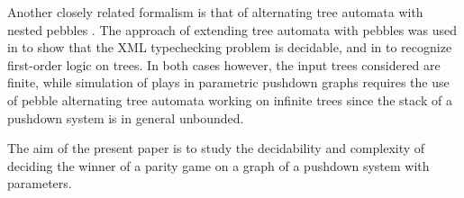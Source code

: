 \documentclass[a4paper,UKenglish,cleveref, autoref, thm-restate]{lipics-v2021}
\begin{document}
%
%




Another closely related formalism is that of alternating tree automata with nested pebbles%
. The approach of extending tree automata with pebbles was used in \cite{milo2000typechecking} to show that the XML typechecking problem is decidable, and in \cite{karhumaki2012jewels} to recognize first-order logic on trees. In both cases however, the input trees considered are finite, while 
simulation of plays in parametric pushdown graphs
requires the use of pebble alternating tree automata working on infinite trees
since the stack of a pushdown system is in general unbounded.



The aim of the present paper is to study the decidability and complexity of
deciding
the winner of a parity game on a graph of a pushdown system with  
parameters.
\end{document}
